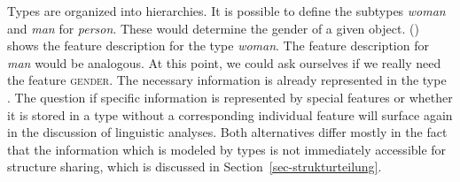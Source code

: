 Types are organized into hierarchies.
It is possible to define the subtypes  \textit{woman} and \textit{man} for  \textit{person}. These would determine the gender of a given object.
() shows the feature description for the type \textit{woman}. The feature description for \textit{man} would be analogous.
\ea
{}
\z
At this point, we could ask ourselves if we really need the feature \textsc{gender}. The necessary information is already represented in the type .
The question if specific information is represented by special features or whether it is stored in a type without a corresponding individual feature will
surface again in the discussion of linguistic analyses.
Both alternatives differ mostly in the fact that the information which is modeled by types is not
immediately accessible for structure sharing, which is discussed in Section~\ref{sec-strukturteilung}.

